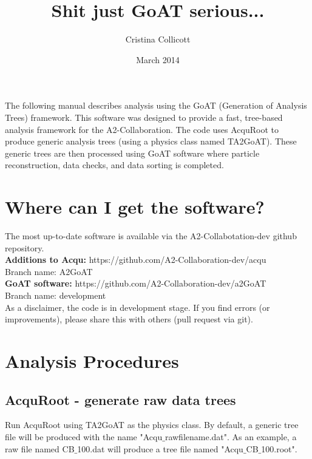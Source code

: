 \documentclass[12pt]{article}
\begin{document}
\title{Shit just GoAT serious...}
\author{Cristina Collicott}
\date{March 2014}
\pagestyle{empty}

\maketitle

\vspace{1cm}
The following manual describes analysis using the GoAT (Generation of Analysis Trees) framework. This software was designed to provide a fast, tree-based analysis framework for the A2-Collaboration. The code uses AcquRoot to produce generic analysis trees (using a physics class named TA2GoAT). These generic trees are then processed using GoAT software where particle reconstruction, data checks, and data sorting is completed. 

\section{Where can I get the software?}
The most up-to-date software is available via the A2-Collabotation-dev github repository. \\

\noindent \textbf{Additions to Acqu:} https://github.com/A2-Collaboration-dev/acqu \\
\noindent Branch name: A2GoAT \\

\noindent \textbf{GoAT software:} https://github.com/A2-Collaboration-dev/a2GoAT \\
\noindent Branch name: development \\

\noindent As a disclaimer, the code is in development stage. If you find errors (or improvements), please share this with others (pull request via git). 

\section{Analysis Procedures}

\subsection{AcquRoot - generate raw data trees}
Run AcquRoot using TA2GoAT as the physics class. By default, a generic tree file will be produced with the name "Acqu$\_$rawfilename.dat". As an example, a raw file named CB$\_$100.dat will produce a tree file named "Acqu$\_$CB$\_$100.root". \\
\end{document}
